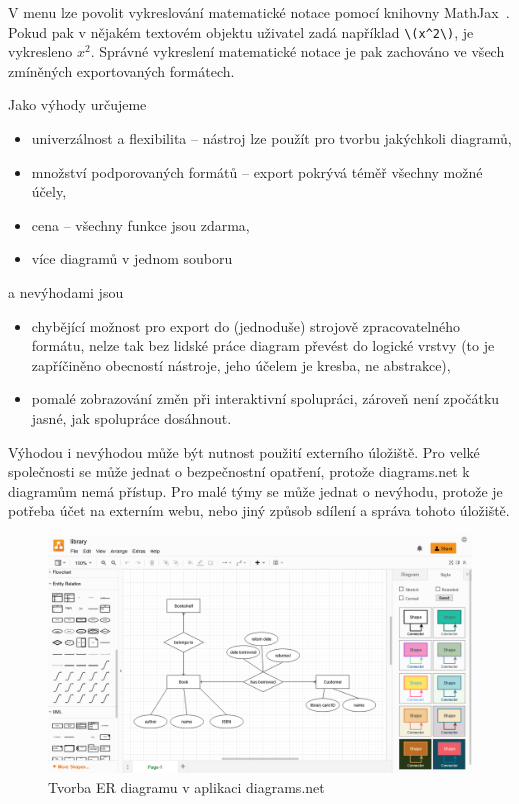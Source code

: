 V menu  lze povolit vykreslování matematické notace pomocí knihovny MathJax~\cite{mathjaxconsortium_mathjax_2022}.
Pokud pak v nějakém textovém objektu uživatel zadá například \verb|\(x^2\)|, je vykresleno $x^2$.
Správné vykreslení matematické notace je pak zachováno ve všech zmíněných exportovaných formátech.

Jako výhody určujeme
\begin{itemize}
  \item univerzálnost a flexibilita -- nástroj lze použít pro tvorbu jakýchkoli diagramů,
  \item množství podporovaných formátů -- export pokrývá téměř všechny možné účely,
  \item cena -- všechny funkce jsou zdarma,
  \item více diagramů v jednom souboru
\end{itemize}
a nevýhodami jsou
\begin{itemize}
  \item chybějící možnost pro export do (jednoduše) strojově zpracovatelného formátu, nelze tak bez lidské práce diagram převést do logické vrstvy (to je zapříčiněno obecností nástroje, jeho účelem je kresba, ne abstrakce),
  \item pomalé zobrazování změn při interaktivní spolupráci, zároveň není zpočátku jasné, jak spolupráce dosáhnout.
\end{itemize}

Výhodou i nevýhodou může být nutnost použití externího úložiště.
Pro velké společnosti se může jednat o bezpečnostní opatření, protože diagrams.net k diagramům nemá přístup.
Pro malé týmy se může jednat o nevýhodu, protože je potřeba účet na externím webu, nebo jiný způsob sdílení a správa tohoto úložiště.

\begin{figure}[!htb]
  \centering
  \includegraphics[width = \maxwidth{\textwidth}]{../img/diagrams.net.png}
  \caption{Tvorba ER diagramu v aplikaci diagrams.net}
  \label{fig:diagrams.net}
\end{figure}

